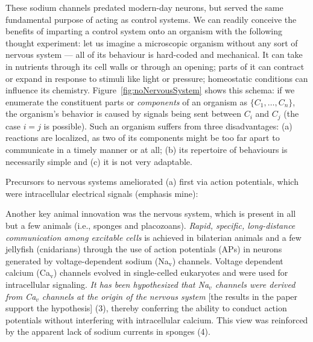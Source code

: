 These sodium channels predated modern-day neurons, but served the same fundamental purpose of acting as control systems. We can readily conceive the benefits of imparting a control system onto an organism with the following thought experiment: let us imagine a microscopic organism without any sort of nervous system --- all of its behaviour is hard-coded and mechanical. It can take in nutrients through its cell walls or through an opening; parts of it can contract or expand in response to stimuli like light or pressure; homeostatic conditions can influence its chemistry. Figure~\ref{fig:noNervousSystem} shows this schema: if we enumerate the constituent parts or {\em components} of an organism as $\{C_1,\dots,C_n\}$, the organism's behavior is caused by signals being sent between $C_i$ and $C_j$ (the case $i=j$ is possible). Such an organism suffers from three disadvantages: (a) reactions are localized, as two of its components might be too far apart to communicate in a timely manner or at all; (b) its repertoire of behaviours is necessarily simple and (c) it is not very adaptable.

Precursors to nervous systems ameliorated (a) first via action potentials, which were intracellular electrical signals \cite{Liebeskind31052011} (emphasis mine):
\begin{emquote}
Another key animal innovation was the nervous system, which is present in all but a few animals (i.e., sponges and placozoans). {\em Rapid, specific, long-distance communication among excitable cells} is achieved in bilaterian animals and a few jellyfish (cnidarians) through the use of action potentials (APs) in neurons generated by voltage-dependent sodium (Na$_\mathrm{v}$) channels. Voltage dependent calcium (Ca$_\mathrm{v}$) channels evolved in single-celled eukaryotes and were used for intracellular signaling. {\em It has been hypothesized that Na$_v$ channels were derived from Ca$_v$ channels at the origin of the nervous system} \textsf{[the results in the paper support the hypothesis]} (3), thereby conferring the ability to conduct action potentials without interfering with intracellular calcium. This view was reinforced by the apparent lack of sodium currents in sponges (4).
\end{emquote}

